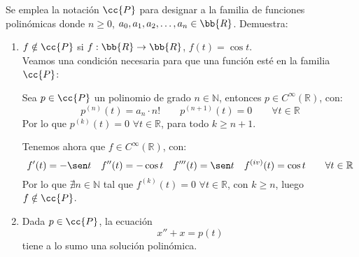 \documentclass[12pt]{article}
\begin{document}
    \begin{ejercicio}
        Se emplea la notación $\cc{P}$ para designar a la familia de funciones polinómicas
        donde $n\geq 0$, $a_0,a_1,a_2,\ldots,a_n\in\bb{R}$. Demuestra:
        \begin{enumerate}
            \item $f\notin \cc{P}$ si $f:\bb{R}\to\bb{R}$, $f(t)=\cos t$.\\

                Veamos una condición necesaria para que una función esté en la familia $\cc{P}$:

                Sea $p\in \cc{P}$ un polinomio de grado $n\in \mathbb{N}$, entonces $p\in C^{\infty}(\mathbb{R})$, con:
                \begin{equation*}
                    p^{(n)}(t) = a_n\cdot n! \qquad p^{(n+1)}(t) = 0 \qquad \forall t\in \mathbb{R}
                \end{equation*}
                Por lo que $p^{(k)}(t) = 0$ $\forall t\in \mathbb{R}$, para todo $k\geq n+1$.

                Tenemos ahora que $f\in C^\infty(\mathbb{R})$, con:
                \begin{equation*}
                    f'(t) = -\sen t \quad f''(t) = -\cos t \quad f'''(t) = \sen t \quad f^{(iv)}(t) = \cos t \qquad \forall t\in \mathbb{R}
                \end{equation*}
                Por lo que $\nexists n\in \mathbb{N}$ tal que $f^{(k)}(t) = 0$ $\forall t\in \mathbb{R}$, con $k\geq n$, luego $f\notin \cc{P}$.
            \item Dada $p\in \cc{P}$, la ecuación
                \begin{equation}\label{eq:ec_ej5}
                x''+x=p(t)
            \end{equation}
            tiene a lo sumo una solución polinómica.\\
            

\end{enumerate}
\end{ejercicio}
\end{document}
